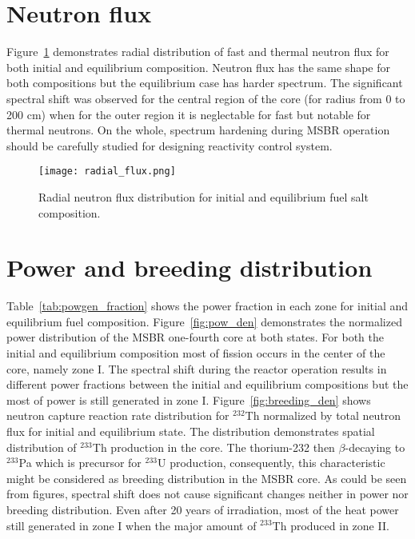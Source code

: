 \section{Neutron flux}
Figure~\ref{fig:radial_flux} demonstrates radial distribution of fast and thermal neutron flux for both initial and equilibrium composition. Neutron flux has the same shape for both compositions but the equilibrium case has harder spectrum. The significant spectral shift was observed for the central region of the core (for radius from 0 to 200 cm) when for the outer region it is neglectable for fast but notable for thermal neutrons. On the whole, spectrum hardening during \gls{MSBR} operation should be carefully studied for designing reactivity control system.

\begin{figure}[htp!] %
  \centering
    \vspace{-0.3em}
  \texttt{[image: radial\_flux.png]} 
  \caption{Radial neutron flux distribution for initial and equilibrium fuel salt composition.}
    \vspace{-0.6em}
  \label{fig:radial_flux}
\end{figure}
\FloatBarrier

\section{Power and breeding distribution}
Table~\ref{tab:powgen_fraction} shows the power fraction in each zone for initial and equilibrium fuel composition. Figure~\ref{fig:pow_den} demonstrates the normalized power distribution of the \gls{MSBR} one-fourth core at both states.  For both the initial and equilibrium composition most of fission occurs in the center of the core, namely zone I. The spectral shift during the reactor operation results in different power fractions between the initial and equilibrium compositions but the most of power is still generated in zone I. Figure~\ref{fig:breeding_den} shows neutron capture reaction rate distribution for $^{232}$Th normalized by total neutron flux for initial and equilibrium state. The distribution demonstrates spatial distribution of $^{233}$Th production in the core. The thorium-232 then $\beta$-decaying to $^{233}$Pa which is precursor for $^{233}$U production, consequently, this characteristic might be considered as breeding distribution in the \gls{MSBR} core. As could be seen from figures, spectral shift does not cause significant changes neither in power nor breeding distribution. Even after 20 years of irradiation, most of the heat power still generated in zone I when the major amount of $^{233}$Th produced in zone II.

